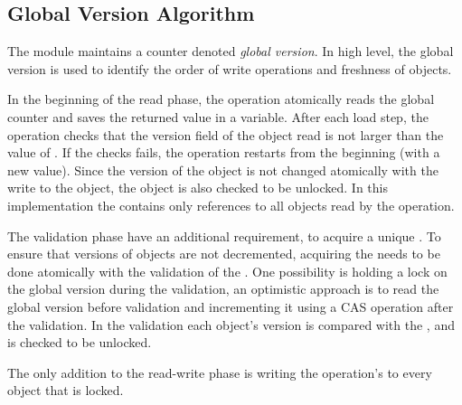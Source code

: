\subsection{Global Version Algorithm}
The module maintains a counter denoted \emph{global version}.
In high level, the global version is used to identify 
the order of write operations and freshness of objects.   

In the beginning of the read phase, the operation atomically
reads the global counter and saves the returned value in 
a \readV variable. After each load step, the
operation checks that the version field of the object read
is not larger than the value of \readV. If the checks fails,
the operation restarts from the beginning 
(with a new \readV value). Since the version of the object 
is not changed atomically with the write to the object, 
the object is also checked to be unlocked. 
In this implementation the \readSet contains only 
references to all objects read by the operation.
 
The validation phase have an 
additional  requirement, to acquire a unique \writeV. 
To ensure that versions of objects are not decremented, 
acquiring the \writeV needs to be done atomically with 
the validation of the \readSet. One possibility is holding a
lock on the global version during the validation, 
an optimistic approach is to read the global version 
before validation and incrementing it using a CAS 
operation after the validation. In the \readSet validation 
each object's version is compared with the \readV, 
and is checked to be unlocked. 

The only addition to the read-write phase is writing the 
operation's \writeV to every object that is locked. 
